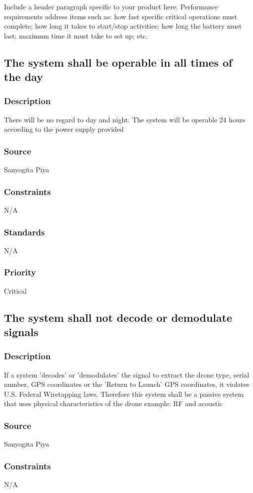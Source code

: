 Include a header paragraph specific to your product here. Performance requirements address items such as: how fast specific critical operations must complete; how long it takes to start/stop activities; how long the battery must last; maximum time it must take to set up; etc.

\subsection{The system shall be operable in all times of the day}
\subsubsection{Description}
There will be no regard to day and night. The system will be operable 24 hours according to the power supply provided
\subsubsection{Source}
Sanyogita Piya
\subsubsection{Constraints}
N/A
\subsubsection{Standards}
N/A
\subsubsection{Priority}
Critical

\subsection{The system shall not decode or demodulate signals}
\subsubsection{Description}
If a system 'decodes' or 'demodulates' the signal to extract the drone type, serial number, GPS coordinates or the 'Return to Launch' GPS coordinates, it violates U.S. Federal Wiretapping laws. Therefore this system shall be a passive system that uses physical characteristics of the drone example: RF and acoustic
\subsubsection{Source}
Sanyogita Piya
\subsubsection{Constraints}
N/A
